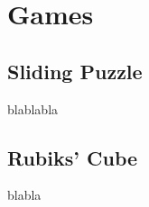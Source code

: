 
\chapter{Games} %

\label{Chapter2} %


\section{Sliding Puzzle}

blablabla

\section{Rubiks' Cube}

blabla

